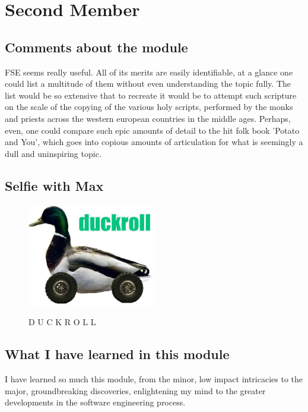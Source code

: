 \section{Second Member}


\subsection{Comments about the module}
FSE seems really useful. All of its merits are easily identifiable, at a glance one could list a multitude of them without even understanding the topic fully. The list would be so extensive that to recreate it would be to attempt such scripture on the scale of the copying of the various holy scripts, performed by the monks and priests across the western european countries in the middle ages. Perhaps, even, one could compare such epic amounts of detail to the hit folk book 'Potato and You', which goes into copious amounts of articulation for what is seemingly a dull and uninspiring topic.

\subsection{Selfie with Max}

\begin{figure}[h]
\caption{D U C K R O L L}
\centering
\includegraphics[width=0.5\textwidth]{Duckroll}
\label{fig:Duckroll in 2 0 1 7}
\end{figure}



\subsection{What I have learned in this module}
I have learned so much this module, from the minor, low impact intricacies to the major, groundbreaking discoveries, enlightening my mind to the greater developments in the software engineering process. 


